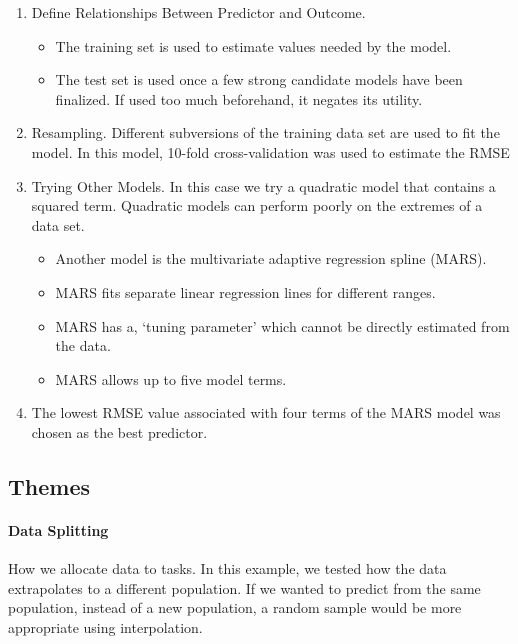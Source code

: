 \documentclass[../main.tex]{subfiles}
\begin{document}
\begin{itemize}
\begin{enumerate}
            \item Define Relationships Between Predictor and Outcome. 
            \begin{itemize}
                \item The training set is used to estimate values needed by the model.
                \item The test set is used once a few strong candidate models have been finalized. If used too much beforehand, it negates its utility.
            \end{itemize}
            \item Resampling. Different subversions of the training data set are used to fit the model. In this model, 10-fold cross-validation was used to estimate the RMSE 
            \item Trying Other Models. In this case we try a quadratic model that contains a squared term. Quadratic models can perform poorly on the extremes of a data set.
            \begin{itemize}
                \item Another model is the multivariate adaptive regression spline (MARS).
                \item MARS fits separate linear regression lines for different ranges.
                \item MARS has a, `tuning parameter' which cannot be directly estimated from the data.
                \item MARS allows up to five model terms.
            \end{itemize}
            \item The lowest RMSE value associated with four terms of the MARS model was chosen as the best predictor.
        \end{enumerate}
    \end{itemize}

\subsection{Themes}

    \paragraph{Data Splitting}
    How we allocate data to tasks. In this example, we tested how the data extrapolates to a different population.
    If we wanted to predict from the same population, instead of a new population, a random sample would be more appropriate using interpolation.
\end{document}
